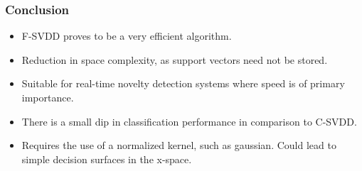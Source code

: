 \documentclass{beamer}
\begin{document}


\begin{frame}
\frametitle{Conclusion}
\begin{itemize}
\item F-SVDD proves to be a very efficient algorithm.
\item Reduction in space complexity, as support vectors need not be stored.
\item Suitable for real-time novelty detection systems where speed is of primary importance.
\item There is a small dip in classification performance in comparison to C-SVDD.
\item Requires the use of a normalized kernel, such as gaussian. Could lead to simple decision surfaces in the x-space.

\end{itemize}
\end{frame}
\end{document}
